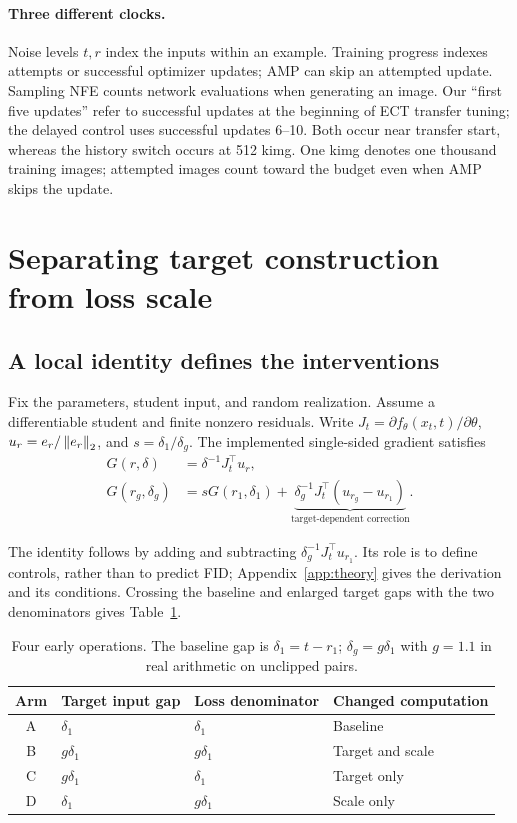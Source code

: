 \paragraph{Three different clocks.}
Noise levels $t,r$ index the inputs within an example. Training progress indexes attempts or successful optimizer updates; AMP can skip an attempted update. Sampling NFE counts network evaluations when generating an image. Our ``first five updates'' refer to successful updates at the beginning of ECT transfer tuning; the delayed control uses successful updates 6--10. Both occur near transfer start, whereas the history switch occurs at 512 kimg. One kimg denotes one thousand training images; attempted images count toward the budget even when AMP skips the update.

\section{Separating target construction from loss scale}
\label{sec:semantics}
\subsection{A local identity defines the interventions}
\begin{lemma}
\label{prop:decomp}
Fix the parameters, student input, and random realization. Assume a differentiable student and finite nonzero residuals. Write $J_t=\partial f_\theta(x_t,t)/\partial\theta$, $u_r=e_r/\left\lVert e_r\right\rVert_2$, and $s=\delta_1/\delta_g$. The implemented single-sided gradient satisfies
\begin{align}
 G(r,\delta)&=\delta^{-1}J_t^\top u_r,\label{eq:field}\\
 G(r_g,\delta_g)&=sG(r_1,\delta_1)+
 \underbrace{\delta_g^{-1}J_t^\top(u_{r_g}-u_{r_1})}_{\text{target-dependent correction}}.
 \label{eq:decomp}
\end{align}
\end{lemma}
The identity follows by adding and subtracting $\delta_g^{-1}J_t^\top u_{r_1}$. Its role is to define controls, rather than to predict FID; Appendix~\ref{app:theory} gives the derivation and its conditions. Crossing the baseline and enlarged target gaps with the two denominators gives Table~\ref{tab:arms}.

\begin{table}[t]
\centering\small
\caption{Four early operations. The baseline gap is $\delta_1=t-r_1$; $\delta_g=g\delta_1$ with $g=1.1$ in real arithmetic on unclipped pairs.}
\label{tab:arms}
\begin{tabular}{clll}
\toprule
Arm & Target input gap & Loss denominator & Changed computation\\
\midrule
A & $\delta_1$ & $\delta_1$ & Baseline\\
B & $g\delta_1$ & $g\delta_1$ & Target and scale\\
C & $g\delta_1$ & $\delta_1$ & Target only\\
D & $\delta_1$ & $g\delta_1$ & Scale only\\
\bottomrule
\end{tabular}
\end{table}


